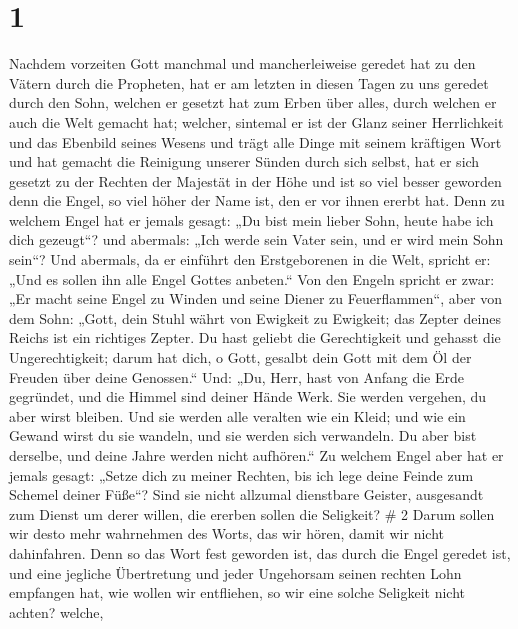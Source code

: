 \hypertarget{section}{%
\section{1}\label{section}}

 Nachdem vorzeiten Gott manchmal und mancherleiweise geredet
hat zu den Vätern durch die Propheten,  hat er am letzten in
diesen Tagen zu uns geredet durch den Sohn, welchen er gesetzt hat zum
Erben über alles, durch welchen er auch die Welt gemacht hat;
 welcher, sintemal er ist der Glanz seiner Herrlichkeit und
das Ebenbild seines Wesens und trägt alle Dinge mit seinem kräftigen
Wort und hat gemacht die Reinigung unserer Sünden durch sich selbst, hat
er sich gesetzt zu der Rechten der Majestät in der Höhe  und
ist so viel besser geworden denn die Engel, so viel höher der Name ist,
den er vor ihnen ererbt hat.  Denn zu welchem Engel hat er
jemals gesagt: „Du bist mein lieber Sohn, heute habe ich dich gezeugt``?
und abermals: „Ich werde sein Vater sein, und er wird mein Sohn sein``?
 Und abermals, da er einführt den Erstgeborenen in die Welt,
spricht er: „Und es sollen ihn alle Engel Gottes anbeten.`` 
Von den Engeln spricht er zwar: „Er macht seine Engel zu Winden und
seine Diener zu Feuerflammen``,  aber von dem Sohn: „Gott,
dein Stuhl währt von Ewigkeit zu Ewigkeit; das Zepter deines Reichs ist
ein richtiges Zepter.  Du hast geliebt die Gerechtigkeit und
gehasst die Ungerechtigkeit; darum hat dich, o Gott, gesalbt dein Gott
mit dem Öl der Freuden über deine Genossen.``  Und: „Du,
Herr, hast von Anfang die Erde gegründet, und die Himmel sind deiner
Hände Werk.  Sie werden vergehen, du aber wirst bleiben.
Und sie werden alle veralten wie ein Kleid;  und wie ein
Gewand wirst du sie wandeln, und sie werden sich verwandeln. Du aber
bist derselbe, und deine Jahre werden nicht aufhören.``  Zu
welchem Engel aber hat er jemals gesagt: „Setze dich zu meiner Rechten,
bis ich lege deine Feinde zum Schemel deiner Füße``?  Sind
sie nicht allzumal dienstbare Geister, ausgesandt zum Dienst um derer
willen, die ererben sollen die Seligkeit? \# 2  Darum sollen
wir desto mehr wahrnehmen des Worts, das wir hören, damit wir nicht
dahinfahren.  Denn so das Wort fest geworden ist, das durch
die Engel geredet ist, und eine jegliche Übertretung und jeder
Ungehorsam seinen rechten Lohn empfangen hat,  wie wollen
wir entfliehen, so wir eine solche Seligkeit nicht achten? welche,
